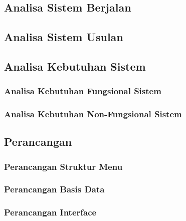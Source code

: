 %
%
%
%


\chapter{\babEmpat}
\section{Analisa Sistem Berjalan}
\section{Analisa Sistem Usulan}
\section{Analisa Kebutuhan Sistem}
\subsection{Analisa Kebutuhan Fungsional Sistem}
\subsection{Analisa Kebutuhan Non-Fungsional Sistem}
\section{Perancangan}
\subsection{Perancangan Struktur Menu}
\subsection{Perancangan Basis Data}
\subsection{Perancangan Interface}

